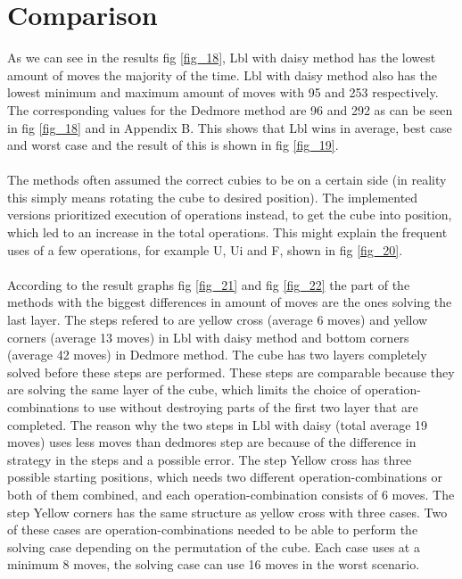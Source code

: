\documentclass[a4paper,11pt]{kth-mag}
\begin{document}
\section{Comparison}
As we can see in the results fig \ref{fig_18}, Lbl with daisy method has the lowest amount of moves the majority of the time. Lbl with daisy method also has the lowest minimum and maximum amount of moves with 95 and 253 respectively. The corresponding values for the Dedmore method are 96 and 292 as can be seen in fig \ref{fig_18} and in Appendix B. This shows that Lbl wins in average, best case and worst case and the result of this is shown in fig \ref{fig_19}.\\\\
The methods often assumed the correct cubies to be on a certain side (in reality this simply means rotating the cube to desired position). The implemented versions prioritized execution of operations instead, to get the cube into position, which led to an increase in the total operations. This might explain the frequent uses of a few operations, for example U, Ui and F, shown in fig \ref{fig_20}.\\\\
According to the result graphs fig \ref{fig_21} and fig \ref{fig_22} the part of the methods with the biggest differences in amount of moves are the ones solving the last layer. The steps refered to are yellow cross (average 6 moves) and yellow corners (average 13 moves) in Lbl with daisy method and bottom corners (average 42 moves) in Dedmore method. The cube has two layers completely solved before these steps are performed. These steps are comparable because they are solving the same layer of the cube, which limits the choice of operation-combinations to use without destroying parts of the first two layer that are completed.  
The reason why the two steps in Lbl with daisy (total average 19 moves) uses less moves than dedmores step are because of the difference in strategy in the steps and a possible error. 
The step Yellow cross has three possible starting positions, which needs two different operation-combinations or both of them combined, and each operation-combination consists of 6 moves.
The step Yellow corners has the same structure as yellow cross with three cases. Two of these cases are operation-combinations needed to be able to perform the solving case depending on the permutation of the cube. Each case uses at a minimum 8 moves, the solving case can use 16 moves in the worst scenario.
\end{document}
